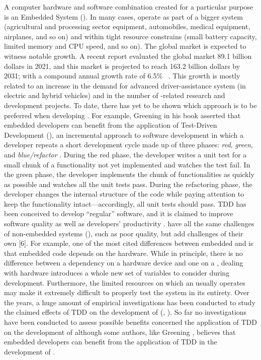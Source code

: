 
A computer hardware and software combination created for a particular purpose is an Embedded System (\es). In many cases, \ess operate as part of a bigger system (\eg  agricultural and processing sector equipment, automobiles, medical equipment, airplanes, and so on) and within tight resource constrains (\eg small battery capacity, limited memory and CPU speed, and so on).
The global \ess market is expected to witness notable growth. A recent report evaluated the global \ess market 89.1 billion dollars in 2021, and this market is projected to reach 163.2 billion dollars by 2031; with a compound annual growth rate of 6.5\%~ \cite{ESSTR2022}. This growth is mostly related to an increase in the demand for advanced driver-assistance system (in electric and hybrid vehicles) and in the number of \ess-related research and development projects.  
To date, there has yet to be shown which approach is to be preferred when developing \ess. For example, Greening \cite{TDDEC} in his book asserted that embedded developers can benefit from the application of
Test-Driven Development (\tdd), an incremental approach to software development in which a developer repeats a short development cycle made up of three phases: \textit{red}, \textit{green}, and \textit{blue/refactor} \cite{TDDByExample}. During the red phase, the developer writes a unit test for a small chunk of a functionality not yet implemented and watches the test fail. In the green phase, the developer implements the chunk of functionalities as quickly as possible and watches all the unit tests pass. During the refactoring phase, the developer changes the internal structure of the code while paying attention to keep the functionality intact—accordingly, all unit tests should pass. TDD has been conceived to develop “regular” software, and it is claimed to improve software quality as well as developers' productivity \cite{DBLP:reference/se/ErdogmusMJ10}. \ess have all the same challenges of non-embedded systems (\noess), such as poor quality, but add challenges of their own [6]. 
For example, one of the most cited differences between embedded and \noess is that embedded code depends on the hardware. While in principle, there is no difference between a dependency on a hardware device and one on a \noess \cite{TDDEC}, dealing with hardware introduces a whole new set of variables to consider during development. Furthermore, the limited resources on which an \es usually operates may make it extremely difficult to properly test the system in its entirety. 
Over the years, a huge amount of empirical investigations has been conducted to study the claimed effects of TDD on the development of \noess (\eg, \cite{DBLP:journals/software/KaracT18}). So far no investigations have been conducted to assess possible benefits concerned the application of TDD on the development of \ess although some authors, like Greening \cite{TDDEC}, believes that embedded developers can benefit from the application of TDD in the development of \ess.

